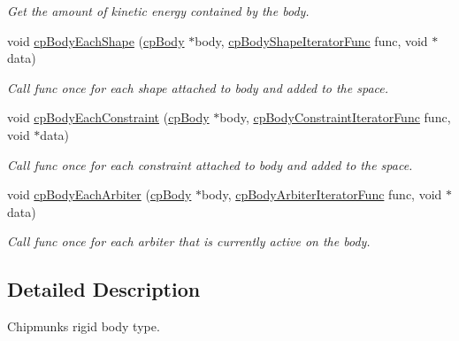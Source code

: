 \begin{DoxyCompactItemize}
\begin{DoxyCompactList}\small\item\em Get the amount of kinetic energy contained by the body. \end{DoxyCompactList}\item 
\hypertarget{group__cp_body_ga51f56b6099dc8321ce284ecc6241b285}{}void \hyperlink{group__cp_body_ga51f56b6099dc8321ce284ecc6241b285}{cp\+Body\+Each\+Shape} (\hyperlink{structcp_body}{cp\+Body} $\ast$body, \hyperlink{group__cp_body_gacc4f466cbeaa87fc8b05c0357e1e316d}{cp\+Body\+Shape\+Iterator\+Func} func, void $\ast$data)\label{group__cp_body_ga51f56b6099dc8321ce284ecc6241b285}

\begin{DoxyCompactList}\small\item\em Call {\ttfamily func} once for each shape attached to {\ttfamily body} and added to the space. \end{DoxyCompactList}\item 
\hypertarget{group__cp_body_ga377e83841ec8a67ca93685cb0bd6525e}{}void \hyperlink{group__cp_body_ga377e83841ec8a67ca93685cb0bd6525e}{cp\+Body\+Each\+Constraint} (\hyperlink{structcp_body}{cp\+Body} $\ast$body, \hyperlink{group__cp_body_ga8cacab9a606b0dbb1dad405bb0d7ba12}{cp\+Body\+Constraint\+Iterator\+Func} func, void $\ast$data)\label{group__cp_body_ga377e83841ec8a67ca93685cb0bd6525e}

\begin{DoxyCompactList}\small\item\em Call {\ttfamily func} once for each constraint attached to {\ttfamily body} and added to the space. \end{DoxyCompactList}\item 
\hypertarget{group__cp_body_gacc958b3adad795e718682bea830d4135}{}void \hyperlink{group__cp_body_gacc958b3adad795e718682bea830d4135}{cp\+Body\+Each\+Arbiter} (\hyperlink{structcp_body}{cp\+Body} $\ast$body, \hyperlink{group__cp_body_gac655e03d7b2d7fd0a870a702f9de0026}{cp\+Body\+Arbiter\+Iterator\+Func} func, void $\ast$data)\label{group__cp_body_gacc958b3adad795e718682bea830d4135}

\begin{DoxyCompactList}\small\item\em Call {\ttfamily func} once for each arbiter that is currently active on the body. \end{DoxyCompactList}\end{DoxyCompactItemize}


\subsection{Detailed Description}
Chipmunk\textquotesingle{}s rigid body type. 

